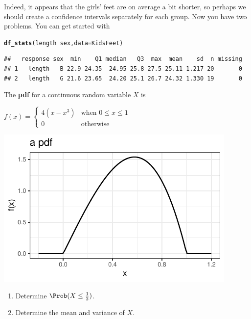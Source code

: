 \documentclass[twoside]{book}\usepackage[]{graphicx}\usepackage[]{xcolor}
\makeatletter
\def\maxwidth{ %
  \ifdim\Gin@nat@width>\linewidth
    \linewidth
  \else
    \Gin@nat@width
  \fi
}
\newcommand{\hlopt}[1]{\textcolor[rgb]{0,0,0}{#1}}%
\newcommand{\hlstd}[1]{\textcolor[rgb]{0.345,0.345,0.345}{#1}}%
\newcommand{\hlkwc}[1]{\textcolor[rgb]{0.333,0.667,0.333}{#1}}%
\newcommand{\hlkwd}[1]{\textcolor[rgb]{0.737,0.353,0.396}{\textbf{#1}}}%
\newenvironment{kframe}{%
 \def\at@end@of@kframe{}%
 \ifinner\ifhmode%
  \def\at@end@of@kframe{\end{minipage}}%
  \begin{minipage}{\columnwidth}%
 \fi\fi%
 \def\FrameCommand##1{\hskip\@totalleftmargin \hskip-\fboxsep
 \colorbox{shadecolor}{##1}\hskip-\fboxsep
     \hskip-\linewidth \hskip-\@totalleftmargin \hskip\columnwidth}%
 \MakeFramed {\advance\hsize-\width
   \@totalleftmargin\z@ \linewidth\hsize
   \@setminipage}}%
 {\par\unskip\endMakeFramed%
 \at@end@of@kframe}
\newenvironment{knitrout}{}{} %
\makeatother
\begin{document}
\begin{solution}
\begin{knitrout}
{}



\end{knitrout}
Indeed, it appears that the girls' feet are on average a bit shorter, so perhaps 
we should create a confidence intervals separately for each group.  Now you have two
problems.  You can get started with
\begin{knitrout}
\color{fgcolor}\begin{kframe}
\begin{alltt}
\hlkwd{df_stats}\hlstd{(length} \hlopt{~} \hlstd{sex,} \hlkwc{data} \hlstd{= KidsFeet)}
\end{alltt}
\begin{verbatim}
##   response sex  min    Q1 median   Q3  max  mean    sd  n missing
## 1   length   B 22.9 24.35  24.95 25.8 27.5 25.11 1.217 20       0
## 2   length   G 21.6 23.65  24.20 25.1 26.7 24.32 1.330 19       0
\end{verbatim}
\end{kframe}
\end{knitrout}

\end{solution}

\begin{problem}
The {\bf pdf} for a continuous random variable $X$ is
\medskip

$
\displaystyle
f(x) = \begin{cases}
  4(x - x^3) & \mbox{when } 0\le x \le 1 \\
0 & \mbox{otherwise}
\end{cases}
$
\begin{knitrout}
\color{fgcolor}

{\centering \includegraphics[width=\maxwidth]{figures/fig-unnamed-chunk-171-1} 

}



\end{knitrout}

\begin{enumerate}
\item
Determine $\Prob(X \le \frac{1}{2})$.
\item
Determine the mean and variance of $X$.
\end{enumerate}
\end{problem}
\end{document}
